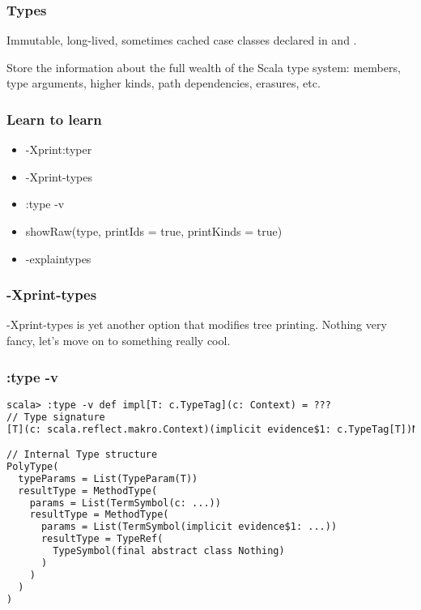 \documentclass[hyperref={bookmarks=false}]{beamer}
\begin{document}
\begin{frame}[fragile]
\frametitle{Types}

Immutable, long-lived, sometimes cached case classes declared in  and .

Store the information about the full wealth of the Scala type system:
members, type arguments, higher kinds, path dependencies, erasures, etc.

\end{frame}

\begin{frame}[fragile]
\frametitle{Learn to learn}

\begin{itemize}
\item -Xprint:typer
\item -Xprint-types
\item :type -v
\item showRaw(type, printIds = true, printKinds = true)
\item -explaintypes
\end{itemize}

\end{frame}

\begin{frame}[fragile]
\frametitle{-Xprint-types}

-Xprint-types is yet another option that modifies tree printing.
Nothing very fancy, let's move on to something really cool.

\end{frame}

\begin{frame}[fragile]
\frametitle{:type -v}

\begin{lstlisting}[language=XML]
scala> :type -v def impl[T: c.TypeTag](c: Context) = ???
// Type signature
[T](c: scala.reflect.makro.Context)(implicit evidence$1: c.TypeTag[T])Nothing

// Internal Type structure
PolyType(
  typeParams = List(TypeParam(T))
  resultType = MethodType(
    params = List(TermSymbol(c: ...))
    resultType = MethodType(
      params = List(TermSymbol(implicit evidence$1: ...))
      resultType = TypeRef(
        TypeSymbol(final abstract class Nothing)
      )
    )
  )
)
\end{lstlisting}
\end{frame}
\end{document}
